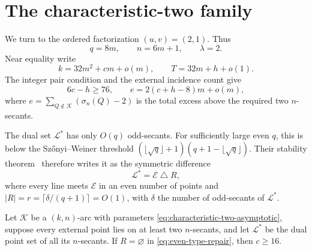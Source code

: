 \section{The characteristic-two family}\label{sec:characteristic-two}

We turn to the ordered factorization \((u,v)=(2,1)\).  Thus
\[
 q=8m,\qquad n=6m+1,\qquad \lambda=2.
\]
Near equality write
\begin{equation}\label{eq:characteristic-two-asymptotic}
 k=32m^2+cm+o(m),\qquad T=32m+h+o(1).
\end{equation}
The integer pair condition and the external incidence count give
\begin{equation}\label{eq:characteristic-two-linear}
 6c-h\ge76,\qquad
 e=2(c+h-8)m+o(m),
\end{equation}
where \(e=\sum_{Q\notin\mathcal K}(\sigma_n(Q)-2)\) is the total excess
above the required two \(n\)-secants.

The dual set \(\mathcal L^*\) has only \(O(q)\) odd-secants.  For sufficiently
large even \(q\), this is below the Sz\H{o}nyi--Weiner threshold
\((\lfloor\sqrt q\rfloor+1)(q+1-\lfloor\sqrt q\rfloor)\).  Their stability
theorem~\cite[Theorem~1.1]{SWeven} therefore writes it as the symmetric difference
\begin{equation}\label{eq:even-type-repair}
 \mathcal L^*=\mathcal E\mathbin{\triangle}R,
\end{equation}
where every line meets \(\mathcal E\) in an even number of points and
\(|R|=r=\lceil\delta/(q+1)\rceil=O(1)\), with \(\delta\) the number of
odd-secants of \(\mathcal L^*\).

\begin{lemma}\label{lem:even-type-case}
Let \(\mathcal K\) be a \((k,n)\)-arc with parameters
\eqref{eq:characteristic-two-asymptotic}, suppose every external point lies on
at least two \(n\)-secants, and let \(\mathcal L^*\) be the dual point set of
all its \(n\)-secants.  If \(R=\varnothing\) in
\eqref{eq:even-type-repair}, then \(c\ge16\).
\end{lemma}

